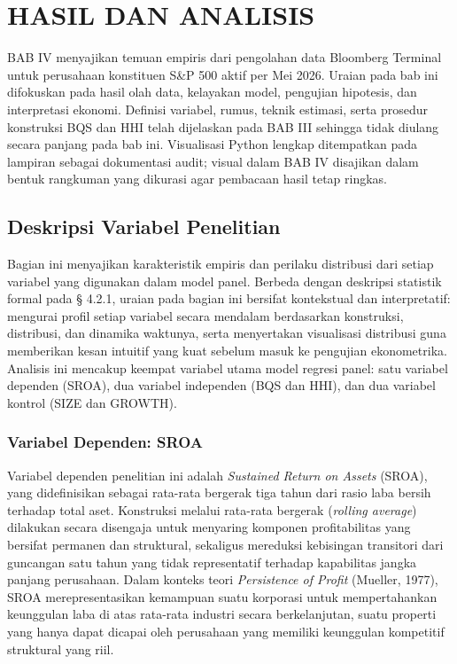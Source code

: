 \documentclass[12pt,a4paper]{article}
\begin{document}
\section{HASIL DAN ANALISIS}\label{hasil-dan-analisis}

BAB IV menyajikan temuan empiris dari pengolahan data Bloomberg Terminal
untuk perusahaan konstituen S\&P 500 aktif per Mei 2026. Uraian pada bab
ini difokuskan pada hasil olah data, kelayakan model, pengujian
hipotesis, dan interpretasi ekonomi. Definisi variabel, rumus, teknik
estimasi, serta prosedur konstruksi BQS dan HHI telah dijelaskan pada
BAB III sehingga tidak diulang secara panjang pada bab ini. Visualisasi
Python lengkap ditempatkan pada lampiran sebagai dokumentasi audit;
visual dalam BAB IV disajikan dalam bentuk rangkuman yang dikurasi agar
pembacaan hasil tetap ringkas.

\subsection{Deskripsi Variabel
Penelitian}\label{deskripsi-variabel-penelitian}

Bagian ini menyajikan karakteristik empiris dan perilaku distribusi dari
setiap variabel yang digunakan dalam model panel. Berbeda dengan
deskripsi statistik formal pada § 4.2.1, uraian pada bagian ini bersifat
kontekstual dan interpretatif: mengurai profil setiap variabel secara
mendalam berdasarkan konstruksi, distribusi, dan dinamika waktunya,
serta menyertakan visualisasi distribusi guna memberikan kesan intuitif
yang kuat sebelum masuk ke pengujian ekonometrika. Analisis ini mencakup
keempat variabel utama model regresi panel: satu variabel dependen
(SROA), dua variabel independen (BQS dan HHI), dan dua variabel kontrol
(SIZE dan GROWTH).

\subsubsection{Variabel Dependen: SROA}\label{variabel-dependen-sroa}

Variabel dependen penelitian ini adalah \emph{Sustained Return on
Assets} (SROA), yang didefinisikan sebagai rata-rata bergerak tiga tahun
dari rasio laba bersih terhadap total aset. Konstruksi melalui rata-rata
bergerak (\emph{rolling average}) dilakukan secara disengaja untuk
menyaring komponen profitabilitas yang bersifat permanen dan struktural,
sekaligus mereduksi kebisingan transitori dari guncangan satu tahun yang
tidak representatif terhadap kapabilitas jangka panjang perusahaan.
Dalam konteks teori \emph{Persistence of Profit} (Mueller, 1977), SROA
merepresentasikan kemampuan suatu korporasi untuk mempertahankan
keunggulan laba di atas rata-rata industri secara berkelanjutan, suatu
properti yang hanya dapat dicapai oleh perusahaan yang memiliki
keunggulan kompetitif struktural yang riil.
\end{document}
